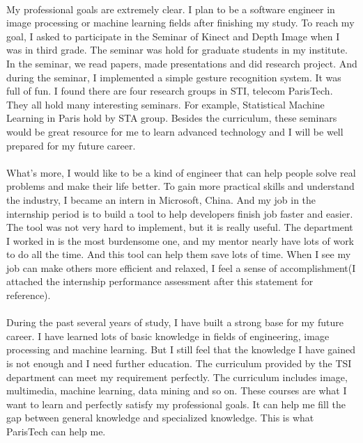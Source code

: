 \documentclass[a4paper]{article}
\begin{document}
\paragraph{}
My professional goals are extremely clear. I plan to be a software engineer in image processing or machine learning fields after finishing my study. To reach my goal,  I asked to participate in the Seminar of Kinect and Depth Image when I was in third grade. The seminar was hold for graduate students in my institute. In the seminar, we read papers, made presentations and did research project. And during the seminar, I implemented a simple gesture recognition system. It was full of fun. I found there are four research groups in STI, telecom ParisTech. They all hold many interesting seminars. For example, Statistical Machine Learning in Paris hold by STA group. Besides the curriculum, these seminars would be great resource for me to learn advanced technology and I will be well prepared for my future career. 
\paragraph{}
What's more, I would like to be a kind of engineer that can help people solve real problems and make their life better. To gain more practical skills and understand the industry, I became an intern in Microsoft, China. And my job in the internship period is to build a tool to help developers finish job faster and easier. The tool was not very hard to implement, but it is really useful. The department I worked in is the most burdensome one, and my mentor nearly have lots of work to do all the time. And this tool can help them save lots of time. When I see my job can make others more efficient and relaxed, I feel a sense of accomplishment(I attached the internship performance assessment after this statement for reference).
\paragraph{}   
During the past several years of study, I have built a strong base for my future career. I have learned lots of basic knowledge in fields of engineering, image processing and machine learning. But I still feel that the knowledge I have gained is not enough and I need further education. The curriculum provided by the TSI department can meet my requirement perfectly. The curriculum includes image, multimedia, machine learning, data mining and so on. These courses are what I want to learn and perfectly satisfy my professional goals. It can help me fill the gap between general knowledge and specialized knowledge. This is what ParisTech can help me.
\end{document}
